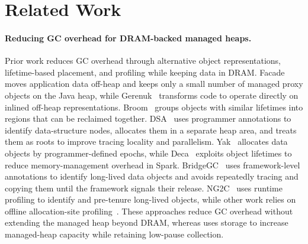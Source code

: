 \section{Related Work}

\paragraph{\textbf{Reducing GC overhead for DRAM-backed managed heaps.}}
Prior work reduces GC overhead through alternative object representations, lifetime-based placement, and profiling while keeping data in DRAM.
Facade~\cite{nguyen:facade} moves application data off-heap and keeps only a small number of managed proxy objects on the Java heap, while Gerenuk~\cite{navasca:gerenuk} transforms code to operate directly on inlined off-heap representations.
Broom~\cite{gog:broom} groups objects with similar lifetimes into regions that can be reclaimed together.
DSA~\cite{cohen:dsa} uses programmer annotations to identify data-structure nodes, allocates them in a separate heap area, and treats them as roots to improve tracing locality and parallelism.
Yak~\cite{khanh:yak} allocates data objects by programmer-defined epochs, while Deca~\cite{lu:deca} exploits object lifetimes to reduce memory-management overhead in Spark.
BridgeGC~\cite{wang:bridgegc} uses framework-level annotations to identify long-lived data objects and avoids repeatedly tracing and copying them until the framework signals their release.
NG2C~\cite{bruno:n2gc} uses runtime profiling to identify and pre-tenure long-lived objects, while other work relies on offline allocation-site profiling~\cite{pretenuring,Blackburn:2001:PJ}.
These approaches reduce GC overhead without extending the managed heap beyond DRAM, whereas \chipperName{} uses storage to increase managed-heap capacity while retaining low-pause collection.

